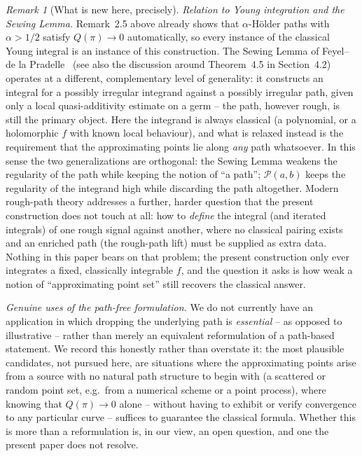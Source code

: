 \documentclass[11pt,fleqn]{article}
\theoremstyle{plain}
\theoremstyle{remark}
\newtheorem{remark}[thm]{Remark}
\begin{document}
\begin{remark}[What is new here, precisely]
\emph{Relation to Young integration and the Sewing Lemma.}
Remark~2.5 above already shows that $\alpha$-H\"older paths with
$\alpha>1/2$ satisfy $Q(\pi)\to0$ automatically, so every instance of
the classical Young integral is an instance of this construction. The
Sewing Lemma of Feyel--de la Pradelle~\cite{FdlP} (see also the
discussion around Theorem~4.5 in Section~4.2) operates at a different,
complementary level of generality: it constructs an integral for a
possibly irregular integrand against a possibly irregular path, given
only a local quasi-additivity estimate on a germ -- the path, however
rough, is still the primary object. Here the integrand is always
classical (a polynomial, or a holomorphic $f$ with known local
behaviour), and what is relaxed instead is the requirement that the
approximating points lie along \emph{any} path whatsoever. In this
sense the two generalizations are orthogonal: the Sewing Lemma weakens
the regularity of the path while keeping the notion of ``a path'';
$\mathcal P(a,b)$ keeps the regularity of the integrand high while
discarding the path altogether. Modern rough-path theory
\cite{Lyons98,FV} addresses a further, harder question that the present
construction does not touch at all: how to \emph{define} the integral
(and iterated integrals) of one rough signal against another, where no
classical pairing exists and an enriched path (the rough-path lift)
must be supplied as extra data. Nothing in this paper bears on that
problem; the present construction only ever integrates a fixed,
classically integrable $f$, and the question it asks is how weak a
notion of ``approximating point set'' still recovers the classical
answer.

\emph{Genuine uses of the path-free formulation.} We do not currently
have an application in which dropping the underlying path is
\emph{essential} -- as opposed to illustrative -- rather than merely an
equivalent reformulation of a path-based statement. We record this
honestly rather than overstate it: the most plausible candidates, not
pursued here, are situations where the approximating points arise from
a source with no natural path structure to begin with (a scattered or
random point set, e.g.\ from a numerical scheme or a point process),
where knowing that $Q(\pi)\to0$ alone -- without having to exhibit or
verify convergence to any particular curve -- suffices to guarantee the
classical formula. Whether this is more than a reformulation is, in our
view, an open question, and one the present paper does not resolve.
\end{remark}
\end{document}

